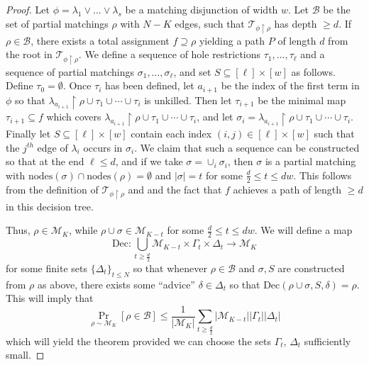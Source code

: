\documentclass[11pt]{article}
\newcommand{\nodes}{\mathrm{nodes}}
\begin{document}
\begin{proof}
Let $\phi= \lambda_1 \lor \ldots \lor \lambda_s$ be a matching disjunction of width $w$. Let $\mathcal{B}$ be the set of partial matchings $\rho$ with $N - K$ edges, such that $\mathcal{T}_{\phi \upharpoonright \rho}$ has depth $\geq d$. 
If $\rho \in \mathcal{B}$, there exists a total assignment $f \supseteq \rho$ yielding a path $P$ of length $d$ from the root in $\mathcal{T}_{\phi \upharpoonright \rho}$. We define a sequence of hole restrictions $\tau_1,\dots,\tau_{\ell}$ and a sequence of partial matchings $\sigma_1,\ldots,\sigma_{\ell}$, and set $S \subseteq [\ell] \times [w]$ as follows. Define $\tau_0 = \emptyset$. Once $\tau_i$ has been defined, let $a_{i+1}$ be the index of the first term in $\phi$ so that $\lambda_{a_{i+1}} \upharpoonright \rho \cup \tau_1 \cup \cdots \cup \tau_i$ is unkilled. Then let $\tau_{i+1}$ be the minimal map $\tau_{i+1} \subseteq f$ which covers $\lambda_{a_{i+1}} \upharpoonright \rho \cup \tau_1 \cup \cdots \cup \tau_i$, and let $\sigma_i = \lambda_{a_{i+1}} \upharpoonright \rho \cup \tau_1 \cup \cdots \cup \tau_i$. Finally let $S \subseteq [\ell] \times [w]$ contain each index $(i,j) \in [\ell] \times [w]$ such that the $j^{th}$ edge of $\lambda_i$ occurs in $\sigma_i$. We claim that such a sequence can be constructed so that at the end $\ell \leq d$, and if we take $\sigma = \cup_i \sigma_i$, then $\sigma$ is a partial matching with $\nodes(\sigma) \cap \nodes(\rho) = \emptyset$ and $|\sigma|=t$ for some $\frac{d}{2} \leq t \leq dw$. This follows from the definition of $\mathcal{T}_{\phi \upharpoonright \rho}$ and and the fact that $f$ achieves a path of length $\geq d$ in this decision tree.

Thus, $\rho \in \mathcal{M}_K$, while $\rho \cup \sigma \in \mathcal{M}_{K-t}$ for some $\frac{d}{2} \leq t \leq dw$. We will define a map 
\[
\mathrm{Dec}: \bigcup\limits_{t \geq \frac{d}{2}}\mathcal{M}_{K-t}  \times \Gamma_t \times \Delta_t \to \mathcal{M}_K
\]
for some finite sets $\{\Delta_t\}_{t \leq N}$ so that whenever $\rho \in \mathcal{B}$ and $\sigma, S$ are constructed from $\rho$ as above, there exists some ``advice'' $\delta \in \Delta_t$ so that $\mathrm{Dec}(\rho \cup \sigma, S,\delta) = \rho$. This will imply that
\[
\Pr_{\rho \sim \mathcal{M}_{K}}[\rho \in \mathcal{B}] \leq \frac{1}{|\mathcal{M}_K|} \sum\limits_{t \geq \frac{d}{2}} |\mathcal{M}_{K-t}|  |\Gamma_t| |\Delta_t|
\]
which will yield the theorem provided we can choose the sets $\Gamma_t$, $\Delta_t$ sufficiently small.


\end{proof}
\end{document}
